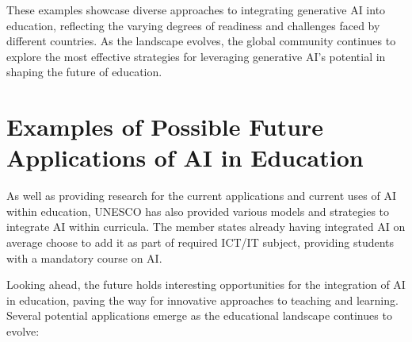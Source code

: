 \documentclass[a4paper,12pt]{report}
\begin{document}
These examples showcase diverse approaches to integrating generative AI into education, reflecting the varying degrees of readiness and challenges faced by different countries. As the landscape evolves, the global community continues to explore the most effective strategies for leveraging generative AI's potential in shaping the future of education.

\newpage

\section{Examples of Possible Future Applications of AI in Education} \label{sect:future}
\hspace{10mm} As well as providing research for the current applications and current uses of AI within education, UNESCO has also provided various models and strategies to integrate AI within curricula. The member states already having integrated AI on average choose to add it as part of required ICT/IT subject, providing students with a mandatory course on AI.

Looking ahead, the future holds interesting opportunities for the integration of AI in education, paving the way for innovative approaches to teaching and learning. Several potential applications emerge as the educational landscape continues to evolve:
\end{document}
